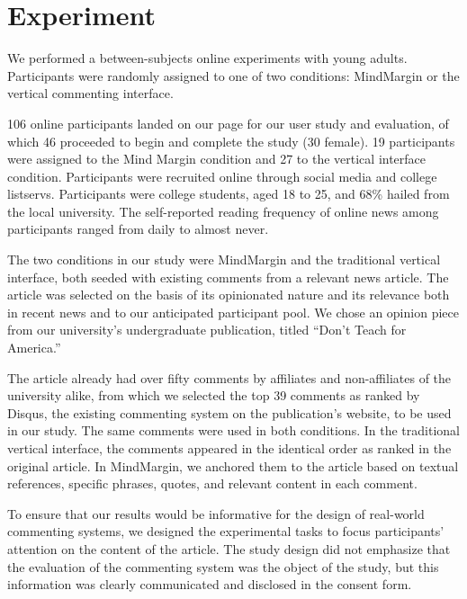 \section{Experiment}

We performed a between-subjects online experiments with young adults. Participants were randomly assigned to one of two conditions: MindMargin or the vertical commenting interface.

106 online participants landed on our page for our user study and evaluation, of which 46 proceeded to begin and complete the study (30 female). 19 participants were assigned to the Mind Margin condition and 27 to the vertical interface condition.  Participants were recruited online through social media and college listservs. Participants were college students, aged 18 to 25, and 68\% hailed from the local university. The self-reported reading frequency of online news among participants ranged from daily to almost never. 

The two conditions in our study were MindMargin and the traditional vertical interface, both seeded with existing comments from a relevant news article. The article was selected on the basis of its opinionated nature and its relevance both in recent news and to our anticipated participant pool. We chose an opinion piece from our university's undergraduate publication, titled “Don't Teach for America.” 

The article already had over fifty comments by affiliates and non-affiliates of the university alike, from which we selected the top 39 comments as ranked by Disqus, the existing commenting system on the publication's website, to be used in our study. The same comments were used in both conditions. In the traditional vertical interface, the comments appeared in the identical order as ranked in the original article. In MindMargin, we anchored them to the article based on textual references, specific phrases, quotes, and relevant content in each comment. 



To ensure that our results would be informative for the design of real-world commenting systems, we designed the experimental tasks to focus participants' attention on the content of the article.  The study design did not emphasize that the evaluation of the commenting system was the object of the study, but this information was clearly communicated and disclosed in the consent form. 

